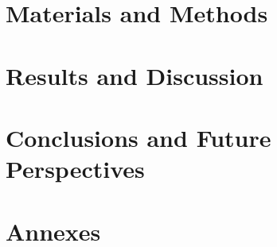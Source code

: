 \documentclass[11pt, a4paper]{report}
\newcommand{\importsection}[1]{}
\begin{document}
\chapter{Materials and Methods}
\importsection{methods}
\clearpage %

\chapter{Results and Discussion}
\importsection{results_patched}
\clearpage %

\chapter{Conclusions and Future Perspectives}
\importsection{conclusions}
\clearpage %


\clearpage %

\appendix
\chapter{Annexes}
\importsection{appendix_a}
\clearpage %
\importsection{appendix_b}
\clearpage %
\end{document}
